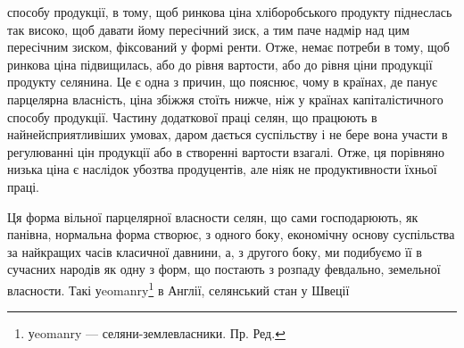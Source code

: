 способу продукції, в тому, щоб ринкова ціна хліборобського продукту піднеслась
так високо, щоб давати йому пересічний зиск, а тим паче надмір над цим
пересічним зиском, фіксований у формі ренти. Отже, немає потреби в тому,
щоб ринкова ціна підвищилась, або до рівня вартости, або до рівня ціни продукції
продукту селянина. Це є одна з причин, що пояснює, чому в країнах,
де панує парцелярна власність, ціна збіжжя стоїть нижче, ніж у країнах капіталістичного
способу продукції. Частину додаткової праці селян, що працюють
в найнейсприятливіших умовах, даром дається суспільству і не бере вона участи
в регулюванні цін продукції або в створенні вартости взагалі. Отже, ця порівняно
низька ціна є наслідок убозтва продуцентів, але ніяк не продуктивности
їхньої праці.

Ця форма вільної парцелярної власности селян, що сами господарюють, як
панівна, нормальна форма створює, з одного боку, економічну основу суспільства
за найкращих часів класичної давнини, а, з другого боку, ми подибуємо
її в сучасних народів як одну з форм, що постають з розпаду февдально,
земельної власности. Такі уeomanry\footnote*{
уeomanry — селяни-землевласники. Пр. Ред.
} в Англії, селянський стан у Швеції